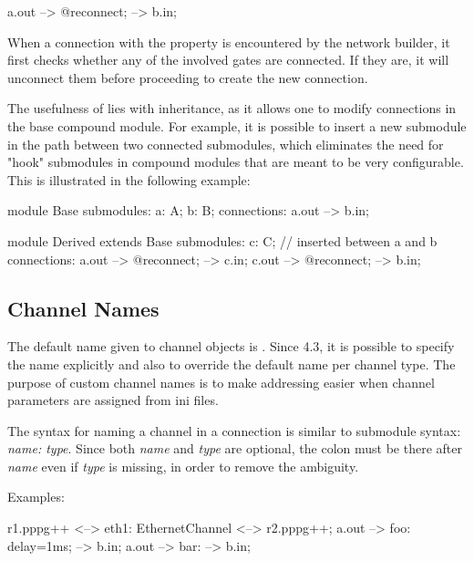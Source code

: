\begin{ned}
a.out --> {@reconnect;} --> b.in;
\end{ned}

When a connection with the  property is encountered by the
network builder, it first checks whether any of the involved gates are connected.
If they are, it will unconnect them before proceeding to create the new connection.

The usefulness of  lies with inheritance, as it allows one
to modify connections in the base compound module. For example, it is possible
to insert a new submodule in the path between two connected submodules, which
eliminates the need for "hook" submodules in compound modules that are meant
to be very configurable. This is illustrated in the following example:


\begin{ned}
module Base {
    submodules:
        a: A;
        b: B;
    connections:
        a.out --> b.in;
}

module Derived extends Base {
    submodules:
        c: C; // inserted between a and b
    connections:
        a.out --> {@reconnect;} --> c.in;
        c.out --> {@reconnect;} --> b.in;
}
\end{ned}


\subsection{Channel Names}
\label{sec:ned-lang:channel-names}

The default name given to channel objects is . Since {\opp} 4.3,
it is possible to specify the name explicitly and also to override
the default name per channel type. The purpose of custom channel names is to make
addressing easier when channel parameters are assigned from ini files.

The syntax for naming a channel in a connection is similar to submodule syntax:
\textit{name: type}. Since both \textit{name} and \textit{type} are optional,
the colon must be there after \textit{name} even if \textit{type} is missing,
in order to remove the ambiguity.

Examples:

\begin{ned}
r1.pppg++ <--> eth1: EthernetChannel <--> r2.pppg++;
a.out --> foo: {delay=1ms;} --> b.in;
a.out --> bar: --> b.in;
\end{ned}

